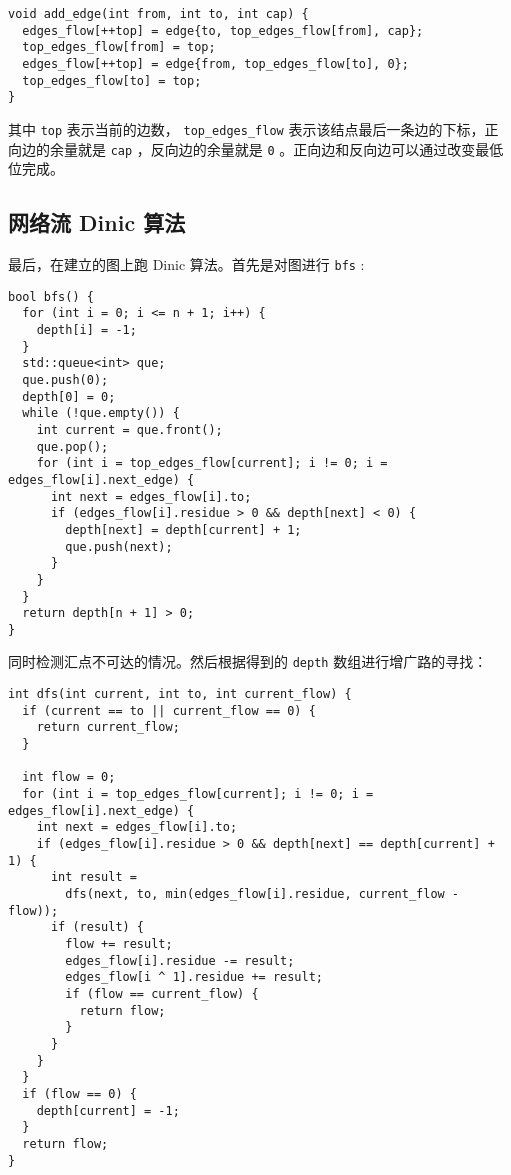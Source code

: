 \documentclass[11pt]{article}
\begin{document}
\begin{verbatim}
void add_edge(int from, int to, int cap) {
  edges_flow[++top] = edge{to, top_edges_flow[from], cap};
  top_edges_flow[from] = top;
  edges_flow[++top] = edge{from, top_edges_flow[to], 0};
  top_edges_flow[to] = top;
}
\end{verbatim}

其中 \texttt{top} 表示当前的边数， \texttt{top\_edges\_flow} 表示该结点最后一条边的下标，正向边的余量就是 \texttt{cap} ，反向边的余量就是 \texttt{0} 。正向边和反向边可以通过改变最低位完成。

\subsection{网络流 Dinic 算法}
\label{sec:org6db176e}
最后，在建立的图上跑 Dinic 算法。首先是对图进行 \texttt{bfs} :

\begin{verbatim}
bool bfs() {
  for (int i = 0; i <= n + 1; i++) {
    depth[i] = -1;
  }
  std::queue<int> que;
  que.push(0);
  depth[0] = 0;
  while (!que.empty()) {
    int current = que.front();
    que.pop();
    for (int i = top_edges_flow[current]; i != 0; i = edges_flow[i].next_edge) {
      int next = edges_flow[i].to;
      if (edges_flow[i].residue > 0 && depth[next] < 0) {
        depth[next] = depth[current] + 1;
        que.push(next);
      }
    }
  }
  return depth[n + 1] > 0;
}
\end{verbatim}

同时检测汇点不可达的情况。然后根据得到的 \texttt{depth} 数组进行增广路的寻找：

\begin{verbatim}
int dfs(int current, int to, int current_flow) {
  if (current == to || current_flow == 0) {
    return current_flow;
  }

  int flow = 0;
  for (int i = top_edges_flow[current]; i != 0; i = edges_flow[i].next_edge) {
    int next = edges_flow[i].to;
    if (edges_flow[i].residue > 0 && depth[next] == depth[current] + 1) {
      int result =
        dfs(next, to, min(edges_flow[i].residue, current_flow - flow));
      if (result) {
        flow += result;
        edges_flow[i].residue -= result;
        edges_flow[i ^ 1].residue += result;
        if (flow == current_flow) {
          return flow;
        }
      }
    }
  }
  if (flow == 0) {
    depth[current] = -1;
  }
  return flow;
}
\end{verbatim}
\end{document}

